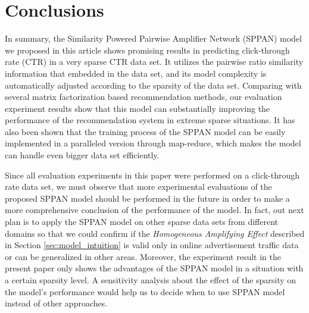 \section{Conclusions}
\label{sec:conclusion}
In summary, the Similarity Powered Pairwise Amplifier Network (SPPAN)
model we proposed in this article shows promising results in
predicting click-through rate (CTR) in a very sparse CTR data set. It
utilizes the pairwise ratio similarity information that embedded in
the data set, and its model complexity is automatically adjusted
according to the sparsity of the data set. Comparing with several
matrix factorization based recommendation methods, our evaluation
experiment results show that this model can substantially improving
the performance of the recommendation system in extreme sparse
situations. It has also been shown that the training process of the
SPPAN model can be easily implemented in a paralleled version through
map-reduce, which makes the model can handle even bigger data set
efficiently.

Since all evaluation experiments in this paper were performed on a
click-through rate data set, we must observe that more experimental
evaluations of the proposed SPPAN model should be performed in the
future in order to make a more comprehensive conclusion of the
performance of the model. In fact, out next plan is to apply the SPPAN
model on other sparse data sets from different domains so that we
could confirm if the {\it Homogeneous Amplifying Effect} described in
Section \ref{sec:model_intuition} is valid only in online
advertisement traffic data or can be generalized in other
areas. Moreover, the experiment result in the present paper only shows
the advantages of the SPPAN model in a situation with a certain
sparsity level. A sensitivity analysis about the effect of the
sparsity on the model's performance would help us to decide when to
use SPPAN model instead of other approaches.
